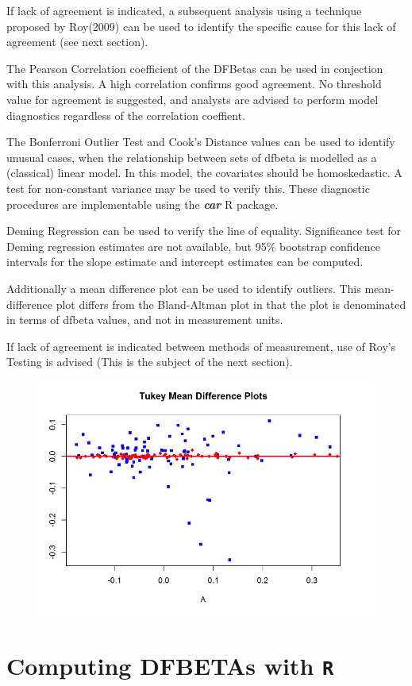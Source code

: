 \documentclass[12pt, a4paper]{report}
\theoremstyle{plain}
\theoremstyle{definition}
\theoremstyle{remark}
\begin{document}
If lack of agreement is indicated, a subsequent analysis using a technique proposed by Roy(2009) can be used to identify the specific cause for this lack of agreement (see next section).
\newpage

The Pearson Correlation coefficient of the DFBetas can be used in conjection with this analysis. A high correlation confirms good agreement. No threshold value for agreement is suggested, and analysts are advised to perform model diagnostics regardless of the correlation coeffient. 


The Bonferroni Outlier Test and Cook's Distance values can be used to identify unusual cases, when the relationship between sets of dfbeta is modelled as a (classical) linear model. In this model, the covariates should be homoskedastic. A test for non-constant variance may be used to verify this. These diagnostic procedures are implementable using the \textbf{\textit{car}} R package.


Deming Regression can be used to verify the line of equality. Significance test for Deming regression estimates are not available, but 95\% bootstrap confidence intervals for the slope estimate and intercept estimates can be computed. 


Additionally a mean difference plot can be used to identify outliers. This mean-difference plot differs from the Bland-Altman plot in that the plot is denominated in terms of dfbeta values, and not in measurement units.

If lack of agreement is indicated between methods of measurement, use of Roy's Testing is advised (This is the subject of the next section).
\begin{figure}[h1]
	\centering
	\includegraphics[width=0.7\linewidth]{images/04-TMDplot}
	
\end{figure}
\newpage
\section{Computing DFBETAs with \texttt{R}}
 
\end{document}
